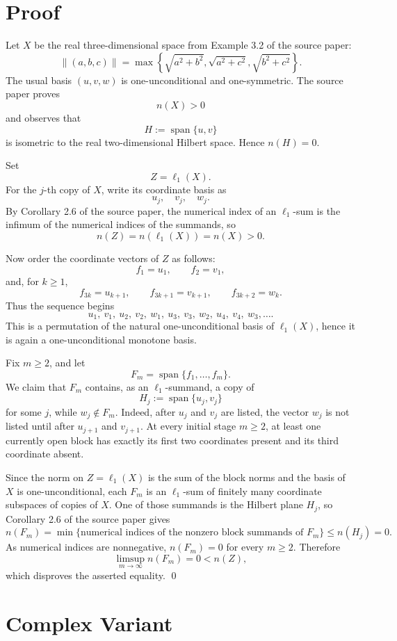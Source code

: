 \documentclass[11pt]{article}
\DeclareMathOperator{\spanop}{span}
\begin{document}
\section*{Proof}

Let \(X\) be the real three-dimensional space from Example 3.2 of the source
paper:
\[
\|(a,b,c)\|
=\max\left\{\sqrt{a^2+b^2},\sqrt{a^2+c^2},\sqrt{b^2+c^2}\right\}.
\]
The usual basis \((u,v,w)\) is one-unconditional and one-symmetric. The source
paper proves
\[
n(X)>0
\]
and observes that
\[
H:=\spanop\{u,v\}
\]
is isometric to the real two-dimensional Hilbert space. Hence \(n(H)=0\).

Set
\[
Z=\ell_1(X).
\]
For the \(j\)-th copy of \(X\), write its coordinate basis as
\[
u_j,\quad v_j,\quad w_j.
\]
By Corollary 2.6 of the source paper, the numerical index of an
\(\ell_1\)-sum is the infimum of the numerical indices of the summands, so
\[
n(Z)=n(\ell_1(X))=n(X)>0.
\]

Now order the coordinate vectors of \(Z\) as follows:
\[
f_1=u_1,\qquad f_2=v_1,
\]
and, for \(k\geq 1\),
\[
f_{3k}=u_{k+1},\qquad
f_{3k+1}=v_{k+1},\qquad
f_{3k+2}=w_k.
\]
Thus the sequence begins
\[
u_1,\ v_1,\ u_2,\ v_2,\ w_1,\ u_3,\ v_3,\ w_2,\ u_4,\ v_4,\ w_3,\ldots .
\]
This is a permutation of the natural one-unconditional basis of
\(\ell_1(X)\), hence it is again a one-unconditional monotone basis.

Fix \(m\geq 2\), and let
\[
F_m=\spanop\{f_1,\ldots,f_m\}.
\]
We claim that \(F_m\) contains, as an \(\ell_1\)-summand, a copy of
\[
H_j:=\spanop\{u_j,v_j\}
\]
for some \(j\), while \(w_j\notin F_m\). Indeed, after \(u_j\) and \(v_j\)
are listed, the vector \(w_j\) is not listed until after \(u_{j+1}\) and
\(v_{j+1}\). At every initial stage \(m\geq 2\), at least one currently open
block has exactly its first two coordinates present and its third coordinate
absent.

Since the norm on \(Z=\ell_1(X)\) is the sum of the block norms and the basis
of \(X\) is one-unconditional, each \(F_m\) is an \(\ell_1\)-sum of finitely
many coordinate subspaces of copies of \(X\). One of those summands is the
Hilbert plane \(H_j\), so Corollary 2.6 of the source paper gives
\[
n(F_m)=\min\{\text{numerical indices of the nonzero block summands of }F_m\}
\leq n(H_j)=0.
\]
As numerical indices are nonnegative, \(n(F_m)=0\) for every \(m\geq 2\).
Therefore
\[
\limsup_{m\to\infty} n(F_m)=0<n(Z),
\]
which disproves the asserted equality.
\qed

\section*{Complex Variant}
\end{document}
